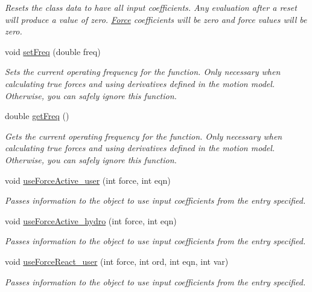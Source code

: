 \begin{DoxyCompactItemize}
\begin{DoxyCompactList}\small\item\em Resets the class data to have all input coefficients. Any evaluation after a reset will produce a value of zero. \hyperlink{class_force}{Force} coefficients will be zero and force values will be zero. \end{DoxyCompactList}\item 
void \hyperlink{classmotion_model_aa26f324999f606c80e777cb9babe6105}{set\-Freq} (double freq)
\begin{DoxyCompactList}\small\item\em Sets the current operating frequency for the function. Only necessary when calculating true forces and using derivatives defined in the motion model. Otherwise, you can safely ignore this function. \end{DoxyCompactList}\item 
double \hyperlink{classmotion_model_a60d84ad61da6a43e5307d800dd144089}{get\-Freq} ()
\begin{DoxyCompactList}\small\item\em Gets the current operating frequency for the function. Only necessary when calculating true forces and using derivatives defined in the motion model. Otherwise, you can safely ignore this function. \end{DoxyCompactList}\item 
void \hyperlink{classmotion_model_a1b324eeb688f22af7054b12b2e15887f}{use\-Force\-Active\-\_\-user} (int force, int eqn)
\begin{DoxyCompactList}\small\item\em Passes information to the object to use input coefficients from the entry specified. \end{DoxyCompactList}\item 
void \hyperlink{classmotion_model_a40a81158ff631506bc61777e489f0d0f}{use\-Force\-Active\-\_\-hydro} (int force, int eqn)
\begin{DoxyCompactList}\small\item\em Passes information to the object to use input coefficients from the entry specified. \end{DoxyCompactList}\item 
void \hyperlink{classmotion_model_a1cdee5159971ff69b650f4bc3f135f64}{use\-Force\-React\-\_\-user} (int force, int ord, int eqn, int var)
\begin{DoxyCompactList}\small\item\em Passes information to the object to use input coefficients from the entry specified. \end{DoxyCompactList}\item 

\end{DoxyCompactItemize}
